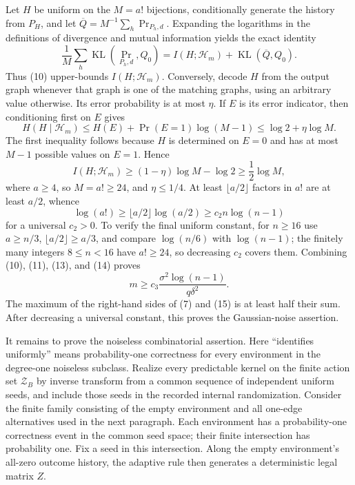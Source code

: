 Let \(H\) be uniform on the \(M=a!\) bijections, conditionally generate the history from \(P_H\), and let \(\overline Q=M^{-1}\sum_h\Pr_{P_h,d}\).  Expanding the logarithms in the definitions of divergence and mutual information yields the exact identity
\[
 \frac1M\sum_h\operatorname{KL}(\Pr_{P_h,d},Q_0)
 =I(H;\mathscr H_m)+\operatorname{KL}(\overline Q,Q_0). \tag{11}
\]
Thus (10) upper-bounds \(I(H;\mathscr H_m)\).  Conversely, decode \(H\) from the output graph whenever that graph is one of the matching graphs, using an arbitrary value otherwise.  Its error probability is at most \(\eta\).  If \(E\) is its error indicator, then conditioning first on \(E\) gives
\[
 H(H\mid\mathscr H_m)
 \le H(E)+\Pr(E=1)\log(M-1)
 \le\log2+\eta\log M. \tag{12}
\]
The first inequality follows because \(H\) is determined on \(E=0\) and has at most \(M-1\) possible values on \(E=1\).  Hence
\[
 I(H;\mathscr H_m)\ge(1-\eta)\log M-\log2\ge\frac12\log M, \tag{13}
\]
where \(a\ge4\), so \(M=a!\ge24\), and \(\eta\le1/4\).  At least \(\lfloor a/2\rfloor\) factors in \(a!\) are at least \(a/2\), whence
\[
 \log(a!)\ge\lfloor a/2\rfloor\log(a/2)\ge c_2n\log(n-1) \tag{14}
\]
for a universal \(c_2>0\).  To verify the final uniform constant, for \(n\ge16\) use \(a\ge n/3\), \(\lfloor a/2\rfloor\ge a/3\), and compare \(\log(n/6)\) with \(\log(n-1)\); the finitely many integers \(8\le n<16\) have \(a!\ge24\), so decreasing \(c_2\) covers them.  Combining (10), (11), (13), and (14) proves
\[
 m\ge c_3\frac{\sigma^2\log(n-1)}{q\delta^2}. \tag{15}
\]
The maximum of the right-hand sides of (7) and (15) is at least half their sum.  After decreasing a universal constant, this proves the Gaussian-noise assertion.

It remains to prove the noiseless combinatorial assertion.  Here ``identifies uniformly'' means probability-one correctness for every environment in the degree-one noiseless subclass.  Realize every predictable kernel on the finite action set \(\mathcal Z_B\) by inverse transform from a common sequence of independent uniform seeds, and include those seeds in the recorded internal randomization.  Consider the finite family consisting of the empty environment and all one-edge alternatives used in the next paragraph.  Each environment has a probability-one correctness event in the common seed space; their finite intersection has probability one.  Fix a seed in this intersection.  Along the empty environment's all-zero outcome history, the adaptive rule then generates a deterministic legal matrix \(Z\).


